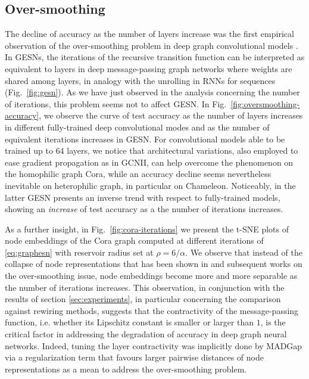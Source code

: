 \documentclass[final,5p,times,twocolumn]{elsarticle}
\begin{document}
\subsection{Over-smoothing}

The decline of accuracy as the number of layers increase was the first empirical observation of the over-smoothing problem in deep graph convolutional models \cite{Li2018}.
In GESNs, the iterations of the recursive transition function can be interpreted as equivalent to layers in deep message-passing graph networks where weights are shared among layers, in analogy with the unrolling in RNNs for sequences (Fig.~\ref{fig:gesn}).
As we have just observed in the analysis concerning the number of iterations, this problem seems not to affect GESN.
In Fig.~\ref{fig:oversmoothing-accuracy}, we observe the curve of test accuracy as the number of layers increases in different fully-trained deep convolutional modes and as the number of equivalent iterations increases in GESN.
For convolutional models able to be trained up to $64$ layers, we notice that architectural variations, also employed to ease gradient propagation as in GCNII, can help overcome the phenomenon on the homophilic graph Cora, while an accuracy decline seems nevertheless inevitable on heterophilic graph, in particular on Chameleon.
Noticeably, in the latter GESN presents an inverse trend with respect to fully-trained models, showing an \emph{increase} of test accuracy as a the number of iterations increases.

As a further insight, in Fig.~\ref{fig:cora-iterations} we present the t-SNE plots of node embeddings of the Cora graph computed at different iterations of \eqref{eq:graphesn} with reservoir radius set at $\rho = 6 / \alpha$.
We observe that instead of the collapse of node representations that has been shown in \cite{Li2018} and subsequent works on the over-smoothing issue, node embeddings become more and more separable as the number of iterations increases.
This observation, in conjunction with the results of section \ref{sec:experiments}, in particular concerning the comparison against rewiring methods, suggests that the contractivity of the message-passing function, i.e. whether its Lipschitz constant is smaller or larger than $1$, is the critical factor in addressing the degradation of accuracy in deep graph neural networks.
Indeed, tuning the layer contractivity was implicitly done by MADGap \cite{Chen2020} via a regularization term that favours larger pairwise distances of node representations as a mean to address the over-smoothing problem.
\end{document}
